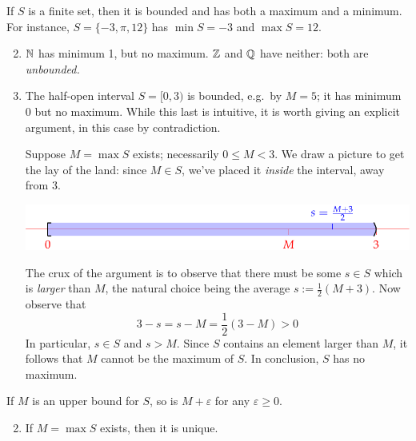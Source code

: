 \begin{examples}{}{}
	\exstart If $S$ is a finite set, then it is bounded and has both a maximum and a minimum. For instance, $S=\{-3,\pi,12\}$ has $\min S=-3$ and $\max S=12$.
	\begin{enumerate}\setcounter{enumi}{1}
		\item $\mathbb{N}$ has minimum 1, but no maximum. $\mathbb{Z}$ and $\mathbb{Q}$ have neither: both are \emph{unbounded.}
		
		\item The half-open interval $S=[0,3)$ is bounded, e.g.\ by $M=5$; it has minimum 0 but no maximum. While this last is intuitive, it is worth giving an explicit argument, in this case by contradiction.\footnotemark{}\par
		Suppose $M=\max S$ exists; necessarily $0\le M<3$. We draw a picture to get the lay of the land: since $M\in S$, we've placed it \emph{inside} the interval, away from 3.
		\begin{center}\vspace{-15pt}
	  	\includegraphics{nomax1}\vspace{-10pt}
	  \end{center}
	  The crux of the argument is to observe that there must be some $s\in S$ which is \emph{larger} than $M$, the natural choice being the average $s:=\frac 12(M+3)$. Now observe that
	  \[
	  	3-s=s-M=\frac 12(3-M)>0
	  \]
	  In particular, $s\in S$ and $s>M$. Since $S$ contains an element larger than $M$, it follows that $M$ cannot be the maximum of $S$. In conclusion, $S$ has no maximum.
	\end{enumerate}
\end{examples}



\begin{lemm}{}{}
	\exstart If $M$ is an upper bound for $S$, so is $M+\varepsilon$ for any $\varepsilon\ge 0$.
	\begin{enumerate}\setcounter{enumi}{1}
	  \item If $M=\max S$ exists, then it is unique.
% 	  
	\end{enumerate}
\end{lemm}

